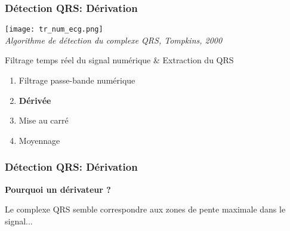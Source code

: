 \documentclass{beamer}
\begin{document}
\begin{frame}
\frametitle{Détection QRS: Dérivation}
\begin{center}
\texttt{[image: tr\_num\_ecg.png]}\\
\textit{\footnotesize Algorithme de détection du complexe QRS, Tompkins, 2000}\\
\vspace{0.3cm}
\end{center}
Filtrage temps réel du signal numérique \& Extraction du QRS
\begin{enumerate}
\item Filtrage passe-bande numérique
\item \textbf{Dérivée} 
\item Mise au carré 
\item Moyennage
\end{enumerate}
\end{frame}

\begin{frame}
\frametitle{Détection QRS: Dérivation}
\textbf{Pourquoi un dérivateur ?}
   	\begin{center}
	\end{center}
	Le complexe QRS semble correspondre aux zones de pente maximale dans le signal...

\end{frame}
\vspace{0.3cm}
\end{document}
